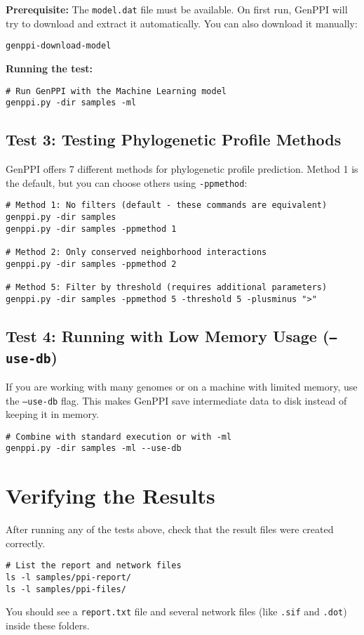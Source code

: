 \documentclass[11pt, a4paper]{article}
\begin{document}
\textbf{Prerequisite:} The \texttt{model.dat} file must be available. On first run, GenPPI will try to download and extract it automatically. You can also download it manually:
\begin{lstlisting}[style=bashstyle]
genppi-download-model
\end{lstlisting}
\textbf{Running the test:}
\begin{lstlisting}[style=bashstyle]
# Run GenPPI with the Machine Learning model
genppi.py -dir samples -ml
\end{lstlisting}

\subsection{Test 3: Testing Phylogenetic Profile Methods}
GenPPI offers 7 different methods for phylogenetic profile prediction. Method 1 is the default, but you can choose others using \texttt{-ppmethod}:
\begin{lstlisting}[style=bashstyle]
# Method 1: No filters (default - these commands are equivalent)
genppi.py -dir samples
genppi.py -dir samples -ppmethod 1

# Method 2: Only conserved neighborhood interactions
genppi.py -dir samples -ppmethod 2

# Method 5: Filter by threshold (requires additional parameters)
genppi.py -dir samples -ppmethod 5 -threshold 5 -plusminus ">"
\end{lstlisting}

\subsection{Test 4: Running with Low Memory Usage (\texttt{--use-db})}
If you are working with many genomes or on a machine with limited memory, use the \texttt{--use-db} flag. This makes GenPPI save intermediate data to disk instead of keeping it in memory.
\begin{lstlisting}[style=bashstyle]
# Combine with standard execution or with -ml
genppi.py -dir samples -ml --use-db
\end{lstlisting}

\section{Verifying the Results}
After running any of the tests above, check that the result files were created correctly.
\begin{lstlisting}[style=bashstyle]
# List the report and network files
ls -l samples/ppi-report/
ls -l samples/ppi-files/
\end{lstlisting}
You should see a \texttt{report.txt} file and several network files (like \texttt{.sif} and \texttt{.dot}) inside these folders.
\end{document}
